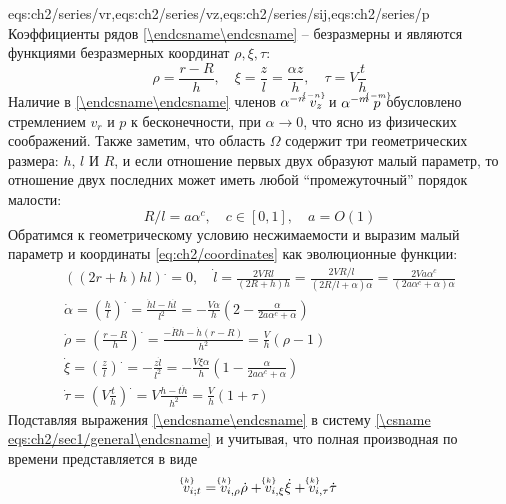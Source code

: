 \expandafter\gdef\csname eqs:ch2/series\endcsname{eqs:ch2/series/vr,eqs:ch2/series/vz,eqs:ch2/series/sij,eqs:ch2/series/p}
Коэффициенты рядов \cref{\csname eqs:ch2/series\endcsname} -- безразмерны и являются функциями безразмерных координат $\rho, \xi, \tau$:
\begin{equation}
  \label{eq:ch2/coordinates}
  \rho = \frac{r-R}{h}, \quad \xi = \frac{z}{l}=\frac{\alpha z}{h}, \quad \tau = V \frac{t}{h}
\end{equation}
Наличие в \cref{\csname eqs:ch2/series\endcsname} членов $\alpha^{-n} \; \uindex{v}{-n}_{z}$ и $\alpha^{-m} \; \uindex{p}{-m}$ обусловлено стремлением $v_{r}$ и $p$ к бесконечности, при $\alpha\rightarrow 0$, что ясно из физических соображений. Также заметим, что область $\Omega$ содержит три геометрических размера: $h$, $l$ И $R$, и если отношение первых двух образуют малый параметр, то отношение двух последних может иметь любой ``промежуточный'' порядок малости:
\begin{equation}
  \label{eq:ch2/sec1/c}
  R/l = a \alpha^c, \quad c\in[0,1], \quad a=O(1)
\end{equation}
Обратимся к геометрическому условию несжимаемости и выразим малый параметр и координаты \cref{eq:ch2/coordinates} как эволюционные функции:
\begin{gather}
  \left(\left(2r+h\right)h l\right)^. = 0, \quad \dot{l} = \frac{2 V R l}{\left(2R + h\right)h}=\frac{2 V R/l}{\left(2R/l + \alpha\right)\alpha}=\frac{2 V a \alpha^c}{\left(2a \alpha^c + \alpha\right)\alpha}\nonumber
  \\
  \dot{\alpha} = \left(\frac{h}{l}\right)^. = \frac{\dot{h}l - h\dot{l}}{l^2} = -\frac{V\alpha}{h}\left(2-\frac{\alpha}{2a\alpha^c+\alpha}\right)
  \\
  \dot{\rho} = \left(\frac{r-R}{h}\right)^. = \frac{-\dot{R} h - \dot{h}\left(r-R\right)}{h^2} = \frac{V}{h}\left(\rho-1\right)
  \\
  \dot{\xi} = \left(\frac{z}{l}\right)^. = -\frac{z \dot{l}}{l^2} = -\frac{V\xi\alpha}{h}\left(1-\frac{\alpha}{2a\alpha^c+\alpha}\right)
  \\
  \dot{\tau} = \left(V \frac{t}{h}\right)^. = V \frac{h - t\dot{h}}{h^2} = \frac{V}{h} \left(1+\tau\right)
\end{gather}
Подставляя выражения \cref{\csname eqs:ch2/series\endcsname} в систему \cref{\csname eqs:ch2/sec1/general\endcsname} и учитывая, что полная производная по времени представляется в виде
\begin{equation*}
  \uindex{v}{k}_{i;t} = \uindex{v}{k}_{i,\rho} \dot{\rho} + \uindex{v}{k}_{i,\xi} \dot{\xi} + \uindex{v}{k}_{i,\tau} \dot{\tau}
\end{equation*}
